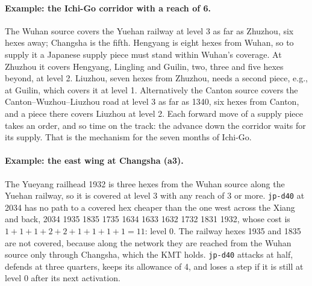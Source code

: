 \documentclass[11pt]{article}
\begin{document}
\paragraph{Example: the Ichi-Go corridor with a reach of 6.} The Wuhan source covers the Yuehan railway at level 3 as far as Zhuzhou, six hexes away; Changsha is the fifth. Hengyang is eight hexes from Wuhan, so to supply it a Japanese supply piece must stand within Wuhan's coverage. At Zhuzhou it covers Hengyang, Lingling and Guilin, two, three and five hexes beyond, at level 2. Liuzhou, seven hexes from Zhuzhou, needs a second piece, e.g., at Guilin, which covers it at level 1. Alternatively the Canton source covers the Canton--Wuzhou--Liuzhou road at level 3 as far as 1340, six hexes from Canton, and a piece there covers Liuzhou at level 2. Each forward move of a supply piece takes an order, and so time on the track: the advance down the corridor waits for its supply. That is the mechanism for the seven months of Ichi-Go.

\paragraph{Example: the east wing at Changsha (a3).} The Yueyang railhead 1932 is three hexes from the Wuhan source along the Yuehan railway, so it is covered at level 3 with any reach of 3 or more. \texttt{jp-d40} at 2034 has no path to a covered hex cheaper than the one west across the Xiang and back, 2034 1935 1835 1735 1634 1633 1632 1732 1831 1932, whose cost is $1+1+1+2+2+1+1+1+1=11$: level 0. The railway hexes 1935 and 1835 are not covered, because along the network they are reached from the Wuhan source only through Changsha, which the KMT holds. \texttt{jp-d40} attacks at half, defends at three quarters, keeps its allowance of 4, and loses a step if it is still at level 0 after its next activation.
\end{document}
